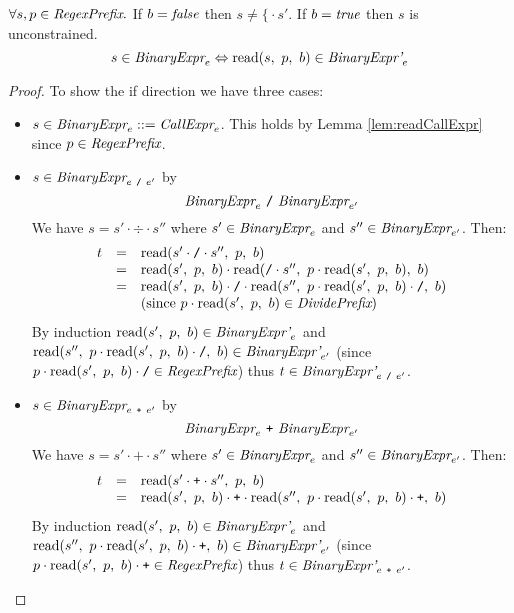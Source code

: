 \documentclass[onecolumn]{sigplanconf-onecolumn}
\begin{document}
\begin{lemma}\mbox{}
  
  \( \forall s, p \in \textit{RegexPrefix}. \)
  If \( b = \textit{false} \) then \( s \not = \texttt{\{} \cdot s' \). If \(
  b = \textit{true} \) then \( s \) is unconstrained.
  \[
  s \in \textit{BinaryExpr}_{e} \Leftrightarrow 
  \textrm{read}(s,~p,~b) \in \textit{BinaryExpr'}_{e} 
  \]

\end{lemma}
\begin{proof}
  To show the if direction we have three cases:
  \begin{itemize}
  \item \( s \in \textit{BinaryExpr}_{e} ::=
    \textit{CallExpr}_{e} \). This holds by Lemma
    \ref{lem:readCallExpr} since \( p \in \textit{RegexPrefix} \).

  \item \( s \in \textit{BinaryExpr}_{e~\texttt{/}~e'} \) by 
    \[
    \textit{BinaryExpr}_{e} ~\texttt{/}~ \textit{BinaryExpr}_{e'} 
    \]
    We have \( s = s' \cdot \div \cdot s'' \) where \( s' \in
    \textit{BinaryExpr}_{e} \) and \( s'' \in
    \textit{BinaryExpr}_{e'} \). Then:
    \[
    \begin{array}{rcl}
      t &=& \textrm{read}(s'\cdot \texttt{/} \cdot s'',~p,~b)
      \\
      &=& 
      \textrm{read}(s',~p,~b) \cdot 
      \textrm{read}(\texttt{/} \cdot s'',~
        p \cdot \textrm{read}(s',~p,~b)
      ,~b)
      \\
      &=& \textrm{read}(s',~p,~b) \cdot \texttt{/} \cdot 
      \textrm{read}(s'',~
        p \cdot \textrm{read}(s',~p,~b) \cdot \texttt{/}
      ,~b)
      \\ 
      && \textrm{(since \( p \cdot \textrm{read}(s',~p,~b) \in \textit{DividePrefix}\))}
    \end{array}
    \]
    By induction \( \textrm{read}(s',~p,~b) \in \textit{BinaryExpr'}_{e} \)
    and \( 
      \textrm{read}(s'',~
        p \cdot \textrm{read}(s',~p,~b) \cdot \texttt{/}
      ,~b) \in \textit{BinaryExpr'}_{e'}
      \) (since \( p \cdot \textrm{read}(s',~p,~b) \cdot \texttt{/} \in \textit{RegexPrefix} \)) thus \( t \in \textit{BinaryExpr'}_{e~\texttt{/}~e'} \).

  \item \( s \in \textit{BinaryExpr}_{e~\texttt{+}~e'} \) by 
    \[
    \textit{BinaryExpr}_{e} ~\texttt{+}~ \textit{BinaryExpr}_{e'} 
    \]
    We have \( s = s' \cdot \texttt{+} \cdot s'' \) where \( s' \in
    \textit{BinaryExpr}_{e} \) and \( s'' \in
    \textit{BinaryExpr}_{e'} \). Then:
    \[
    \begin{array}{rcl}
      t &=& \textrm{read}(s'\cdot \texttt{+} \cdot s'',~p,~b)
      \\
      &=& \textrm{read}(s',~p,~b) \cdot \texttt{+} \cdot 
      \textrm{read}(s'',~
        p \cdot \textrm{read}(s',~p,~b) \cdot \texttt{+}
      ,~b)
    \end{array}
    \]
    By induction \( \textrm{read}(s',~p,~b) \in \textit{BinaryExpr'}_{e}
    \) and \( \textrm{read}(s'',~ p \cdot \textrm{read}(s',~p,~b) \cdot \texttt{+}
    ,~b) \in \textit{BinaryExpr'}_{e'} \) (since \( p \cdot
    \textrm{read}(s',~p,~b) \cdot \texttt{+} \in \textit{RegexPrefix} \)) thus \( t \in
    \textit{BinaryExpr'}_{e~\texttt{+}~e'} \).
  \end{itemize}
\end{proof}
\end{document}
